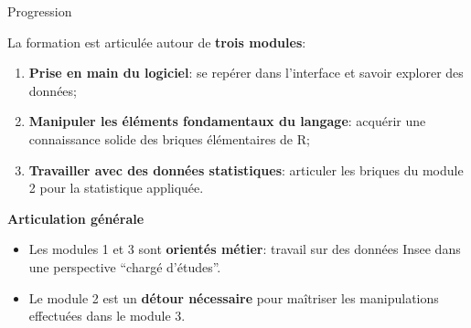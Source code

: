 \documentclass[12pt,ignorenonframetext,]{beamer}
\providecommand{\tightlist}{%
  \setlength{\itemsep}{0pt}\setlength{\parskip}{0pt}}
\newcommand{\strong}[1]{\textbf{\textcolor{redInsee}{#1}}}
\begin{document}
\begin{frame}{Progression}

La formation est articulée autour de \textbf{trois modules}:

\begin{enumerate}
\def\labelenumi{\arabic{enumi}.}
\item
  \pause \textbf{Prise en main du logiciel}: se repérer dans l'interface
  et savoir explorer des données;
\item
  \pause \textbf{Manipuler les éléments fondamentaux du langage}:
  acquérir une connaissance solide des briques élémentaires de R;
\item
  \pause \textbf{Travailler avec des données statistiques}: articuler
  les briques du module 2 pour la statistique appliquée.
\end{enumerate}

\bigskip \pause \strong{Articulation générale}

\begin{itemize}
\tightlist
\item
  \pause Les modules 1 et 3 sont \textbf{orientés métier}: travail sur
  des données Insee dans une perspective \enquote{chargé d'études}.
\item
  \pause Le module 2 est un \textbf{détour nécessaire} pour maîtriser
  les manipulations effectuées dans le module 3.
\end{itemize}

\end{frame}
\end{document}
